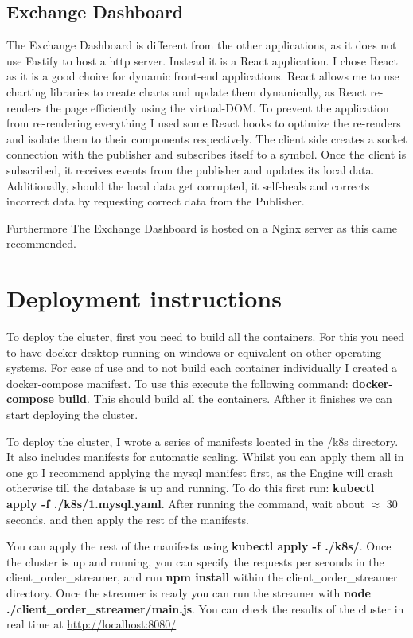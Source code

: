 \documentclass{article}
\begin{document}
\subsection{Exchange Dashboard}
The Exchange Dashboard is different from the other applications, as it does not use Fastify to host a http server.
Instead it is a React application.
I chose React as it is a good choice for dynamic front-end applications.
React allows me to use charting libraries to create charts and update them dynamically, as React re-renders the page efficiently using the virtual-DOM.
To prevent the application from re-rendering everything I used some React hooks to optimize the re-renders and isolate them to their components respectively.
The client side creates a socket connection with the publisher and subscribes itself to a symbol.
Once the client is subscribed, it receives events from the publisher and updates its local data.
Additionally, should the local data get corrupted, it self-heals and corrects incorrect data by requesting correct data from the Publisher.
\par
Furthermore The Exchange Dashboard is hosted on a Nginx server as this came recommended.
\section{Deployment instructions}
To deploy the cluster, first you need to build all the containers. For this you need to have docker-desktop running on windows or equivalent on other operating systems.
For ease of use and to not build each container individually I created a docker-compose manifest.
To use this execute the following command: \textbf{docker-compose build}. This should build all the containers. Afther it finishes we can start deploying the cluster.
\par
To deploy the cluster, I wrote a series of manifests located in the /k8s directory. It also includes manifests for automatic scaling.
Whilst you can apply them all in one go I recommend applying the mysql manifest first, as the Engine will crash otherwise till the database is up and running.
To do this first run: \textbf{kubectl apply -f ./k8s/1.mysql.yaml}.
After running the command, wait about $\approx$ 30 seconds, and then apply the rest of the manifests.
\par
You can apply the rest of the manifests using \textbf{kubectl apply -f ./k8s/}.
Once the cluster is up and running, you can specify the requests per seconds in the client\_order\_streamer, and run \textbf{npm install} within the client\_order\_streamer directory.
Once the streamer is ready you can run the streamer with \textbf{node ./client\_order\_streamer/main.js}.
You can check the results of the cluster in real time at \href{http://localhost:8080/}{http://localhost:8080/}
\end{document}
